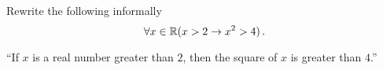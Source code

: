 \guard



\begin{exmp}
\label{exmp:translateQuantifiedConditionalStatements}
  Rewrite the following informally \[ \forall x\in\mathbb{R}( x>2 \rightarrow x^2 > 4 )\,.\]
	\begin{center}
		``If $x$ is a real number greater than $2$, then the square of $x$ is greater than $4$.''
	\end{center}
\end{exmp}
